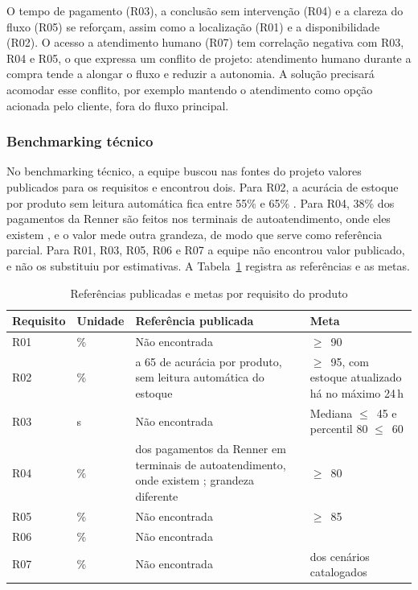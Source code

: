 O tempo de pagamento (R03), a conclusão sem intervenção (R04) e a clareza do fluxo (R05) se reforçam, assim como a localização (R01) e a disponibilidade (R02). O acesso a atendimento humano (R07) tem correlação negativa com R03, R04 e R05, o que expressa um conflito de projeto: atendimento humano durante a compra tende a alongar o fluxo e reduzir a autonomia. A solução precisará acomodar esse conflito, por exemplo mantendo o atendimento como opção acionada pelo cliente, fora do fluxo principal.

\subsubsection{Benchmarking técnico}
\label{subsubsec:benchmarking_tecnico}

No benchmarking técnico, a equipe buscou nas fontes do projeto valores publicados para os requisitos e encontrou dois. Para R02, a acurácia de estoque por produto sem leitura automática fica entre 55\% e 65\% \cite{auburn2026acuracia}. Para R04, 38\% dos pagamentos da Renner são feitos nos terminais de autoatendimento, onde eles existem \cite{consumidormoderno2025renner}, e o valor mede outra grandeza, de modo que serve como referência parcial. Para R01, R03, R05, R06 e R07 a equipe não encontrou valor publicado, e não os substituiu por estimativas. A Tabela~\ref{tab:benchmark_tecnico} registra as referências e as metas.

\begin{table}[htbp]
    \centering
    \caption{Referências publicadas e metas por requisito do produto}
    \label{tab:benchmark_tecnico}
    \footnotesize
    \renewcommand{\arraystretch}{1.3}
    \begin{tabularx}{\textwidth}{@{}
        >{\RaggedRight\arraybackslash}p{1.6cm}
        >{\RaggedRight\arraybackslash}p{1.3cm}
        >{\RaggedRight\arraybackslash}X
        >{\RaggedRight\arraybackslash}p{3.4cm}@{}}
        \toprule
        \textbf{Requisito} & \textbf{Unidade} & \textbf{Referência publicada} & \textbf{Meta} \\
        \midrule
        R01 & \% & Não encontrada & $\geq$~90 \\
        R02 & \% & 55 a 65 de acurácia por produto, sem leitura automática do estoque \cite{auburn2026acuracia} & $\geq$~95, com estoque atualizado há no máximo 24\,h \\
        R03 & s & Não encontrada & Mediana $\leq$~45 e percentil 80 $\leq$~60 \\
        R04 & \% & 38 dos pagamentos da Renner em terminais de autoatendimento, onde existem \cite{consumidormoderno2025renner}; grandeza diferente & $\geq$~80 \\
        R05 & \% & Não encontrada & $\geq$~85 \\
        R06 & \% & Não encontrada & 100 \\
        R07 & \% & Não encontrada & 100 dos cenários catalogados \\
        \bottomrule
    \end{tabularx}
\end{table}

